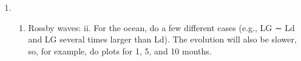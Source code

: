 \documentclass[11pt]{article}
\providecommand{\tightlist}{%
      \setlength{\itemsep}{0pt}\setlength{\parskip}{0pt}}
\begin{document}
    \begin{center}
    \end{center}
    { \hspace*{\fill} \\}
    
    \begin{center}
    \end{center}
    { \hspace*{\fill} \\}
    
    \begin{enumerate}
\def\labelenumi{\arabic{enumi}.}
\item
  \begin{enumerate}
  \def\labelenumii{(\alph{enumii})}
  \setcounter{enumii}{1}
  \tightlist
  \item
    Rossby waves: ii. For the ocean, do a few different cases (e.g., LG
    ∼ Ld and LG several times larger than Ld). The evolution will also
    be slower, so, for example, do plots for 1, 5, and 10 months.
  \end{enumerate}
\end{enumerate}
\end{document}

